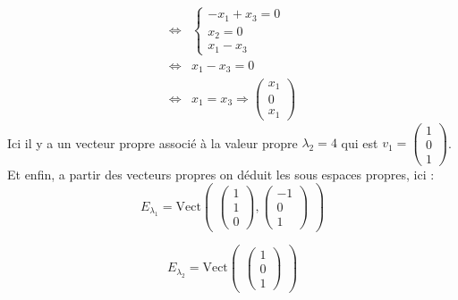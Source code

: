 \begin{ex}
\begin{align*}
    \Leftrightarrow & \begin{cases}-x_1+x_3=0\\ x_2=0\\x_1-x_3\end{cases}\\
    \Leftrightarrow & x_1-x_3=0\\
    \Leftrightarrow & x_1=x_3 \Rightarrow \begin{pmatrix}x_1\\0\\x_1\end{pmatrix}
\end{align*}
Ici il y a un vecteur propre associé à la valeur propre $\lambda_2=4$ qui est $v_1=\begin{pmatrix}1\\0\\1\end{pmatrix}$.\\
\newline 
Et enfin, a partir des vecteurs propres on déduit les sous espaces propres, ici :
$$E_{\lambda_1}=\text{Vect}\begin{pmatrix}\begin{pmatrix}1\\1\\0\end{pmatrix},\begin{pmatrix}-1\\0\\1\end{pmatrix}\end{pmatrix}$$

$$E_{\lambda_2}=\text{Vect}\begin{pmatrix}\begin{pmatrix}1\\0\\1\end{pmatrix}\end{pmatrix}$$
\end{ex}


